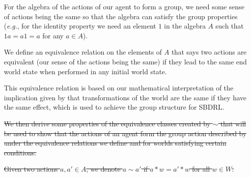 
For the algebra of the actions of our agent to form a group, we need some sense of actions being the same so that the algebra can satisfy the group properties (\textit{e.g.}, for the identity property we need an element $1$ in the algebra $A$ such that $1a = a1 = a$ for any $a \in A$).

We define an equivalence relation on the elements of $A$ that says two actions are equivalent (our sense of the actions being the same) if they lead to the same end world state when performed in any initial world state.

This equivalence relation is based on our mathematical interpretation of the implication given by \cite{Higgins2018} that transformations of the world are the same if they have the same effect, which is used to achieve the group structure for SBDRL.



\sout{
	We then derive some properties of the equivalence classes created by $\sim$ that will be used to show that the actions of an agent form the group action described by \cite{Higgins2018} under the equivalence relations we define and for worlds satisfying certain conditions.
}

\begin{definition}
	\sout{Given two actions $a, a' \in A$, we denote $a \sim a'$ if $a * w = a' * w$ for all $w \in W$.
		}
\end{definition}

